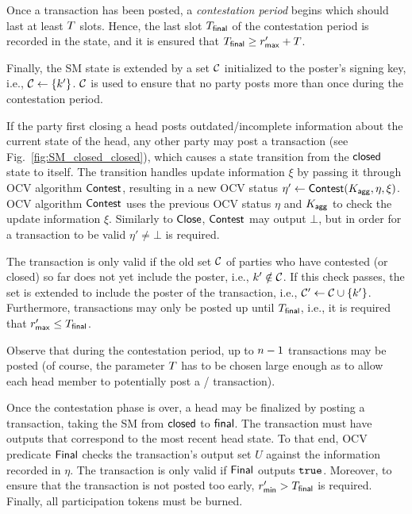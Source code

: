 Once a \mtxClose{} transaction has been posted, a \emph{contestation period}
begins which should last at least $T$ slots.  Hence, the last slot
$T_{\mathsf{final}}$ of the contestation period is recorded in the state, and it
is ensured that $T_{\mathsf{final}} \geq r_{\mathsf{max}}' + T$.

Finally, the SM state is extended by a set $\mathcal C$
initialized to the poster's signing key, i.e.,
$\mathcal C \gets \{k'\}$.   $\mathcal C$ is used to ensure that no party
posts more than once during the contestation period.





 If the party first closing a head posts
outdated/incomplete information about the current state of the head,
any other party may post a \mtxContest{} transaction (see
Fig.~\ref{fig:SM_closed_closed}), which causes a state transition from
the $\mathsf{closed}$ state to itself.  The transition handles update
information $\xi$ by passing it through OCV algorithm $\mathsf{Contest}$,
resulting in a new OCV status
$\eta' \gets \mathsf{Contest} (K_{\mathsf{agg}},\eta,\xi)$.  OCV algorithm
$\mathsf{Contest}$ uses the previous OCV status $\eta$ and $K_{\mathsf{agg}}$ to check
the update information $\xi$.  Similarly to $\mathsf{Close}$, $\mathsf{Contest}$
may output $\bot$, but in order for a \mtxContest{} transaction to be
valid $\eta' \neq \bot$ is required.

The \mtxContest{} transaction is only valid if the old set
$\mathcal C$ of parties who have contested (or closed) so far does not yet
include the poster, i.e., $k' \notin \mathcal C$.  If this check
passes, the set is extended to include the poster of the \mtxContest{}
transaction, i.e., $\mathcal C' \gets \mathcal C \cup \{k'\}$.
Furthermore, \mtxContest{} transactions may only be posted up until
$T_{\mathsf{final}}$, i.e., it is required that $r_{\mathsf{max}}' \leq T_{\mathsf{final}}$.

Observe that during the contestation period, up to $n-1$
\mtxContest{} transactions may be posted (of course, the parameter
$T$ has to be chosen large enough as to allow each head member to
potentially post a \mtxClose{}/\mtxContest{} transaction).






  Once the contestation phase is over, a head
may be finalized by posting a \mtxFanout{} transaction, taking the SM
from $\mathsf{closed}$ to $\mathsf{final}$.  The \mtxFanout{} transaction must
have outputs that correspond to the most recent head state.  To that
end, OCV predicate $\mathsf{Final}$ checks the transaction's output set $U$
against the information recorded in $\eta$.  The \mtxFanout{}
transaction is only valid if $\mathsf{Final}$ outputs $\mathtt{true}$.  Moreover,
to ensure that the \mtxFanout{} transaction is not posted too early,
$r_{\mathsf{min}}' > T_{\mathsf{final}}$ is required.  Finally, all participation tokens
must be burned.


